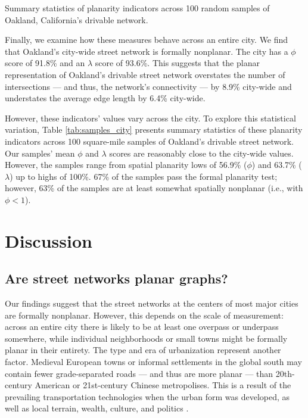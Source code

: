 \documentclass[Afour,sageh,times]{sagej}
\begin{document}
\begin{table}[htbp]
	\centering
	\caption{Summary statistics of planarity indicators across 100 random samples of Oakland, California's drivable network.}
	\label{tab:samples_city}
	
\end{table}

Finally, we examine how these measures behave across an entire city. We find that Oakland's city-wide street network is formally nonplanar. The city has a $\phi$ score of 91.8\% and an $\lambda$ score of 93.6\%. This suggests that the planar representation of Oakland's drivable street network overstates the number of intersections --- and thus, the network's connectivity --- by 8.9\% city-wide and understates the average edge length by 6.4\% city-wide.

However, these indicators' values vary across the city. To explore this statistical variation, Table \ref{tab:samples_city} presents summary statistics of these planarity indicators across 100 square-mile samples of Oakland's drivable street network. Our samples' mean $\phi$ and $\lambda$ scores are reasonably close to the city-wide values. However, the samples range from spatial planarity lows of 56.9\% ($\phi$) and 63.7\% ($\lambda$) up to highs of 100\%. 67\% of the samples pass the formal planarity test; however, 63\% of the samples are at least somewhat spatially nonplanar (i.e., with $\phi < 1$).



\section{Discussion}

\subsection{Are street networks planar graphs?}

Our findings suggest that the street networks at the centers of most major cities are formally nonplanar. However, this depends on the scale of measurement: across an entire city there is likely to be at least one overpass or underpass somewhere, while individual neighborhoods or small towns might be formally planar in their entirety. The type and era of urbanization represent another factor. Medieval European towns or informal settlements in the global south may contain fewer grade-separated roads --- and thus are more planar --- than 20th-century American or 21st-century Chinese metropolises. This is a result of the prevailing transportation technologies when the urban form was developed, as well as local terrain, wealth, culture, and politics \citep{southworth_street_1995}.
\end{document}
